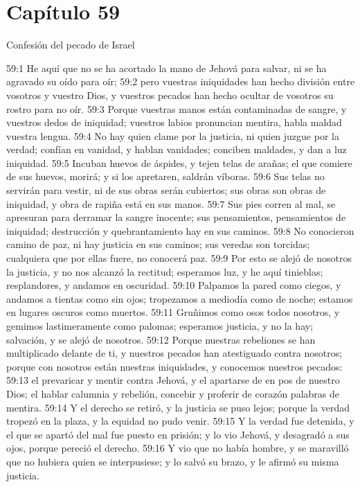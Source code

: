 \section*{Capítulo 59 }
Confesión del pecado de Israel 
 
59:1 He aquí que no se ha acortado la mano de Jehová para salvar, ni se ha agravado su oído para oír; 
59:2 pero vuestras iniquidades han hecho división entre vosotros y vuestro Dios, y vuestros pecados han hecho ocultar de vosotros su rostro para no oír. 
59:3 Porque vuestras manos están contaminadas de sangre, y vuestros dedos de iniquidad; vuestros labios pronuncian mentira, habla maldad vuestra lengua. 
59:4 No hay quien clame por la justicia, ni quien juzgue por la verdad; confían en vanidad, y hablan vanidades; conciben maldades, y dan a luz iniquidad. 
59:5 Incuban huevos de áspides, y tejen telas de arañas; el que comiere de sus huevos, morirá; y si los apretaren, saldrán víboras. 
59:6 Sus telas no servirán para vestir, ni de sus obras serán cubiertos; sus obras son obras de iniquidad, y obra de rapiña está en sus manos. 
59:7 Sus pies corren al mal, se apresuran para derramar la sangre inocente; sus pensamientos, pensamientos de iniquidad; destrucción y quebrantamiento hay en sus caminos. 
59:8 No conocieron camino de paz, ni hay justicia en sus caminos; sus veredas son torcidas; cualquiera que por ellas fuere, no conocerá paz. 
59:9 Por esto se alejó de nosotros la justicia, y no nos alcanzó la rectitud; esperamos luz, y he aquí tinieblas; resplandores, y andamos en oscuridad. 
59:10 Palpamos la pared como ciegos, y andamos a tientas como sin ojos; tropezamos a mediodía como de noche; estamos en lugares oscuros como muertos. 
59:11 Gruñimos como osos todos nosotros, y gemimos lastimeramente como palomas; esperamos justicia, y no la hay; salvación, y se alejó de nosotros. 
59:12 Porque nuestras rebeliones se han multiplicado delante de ti, y nuestros pecados han atestiguado contra nosotros; porque con nosotros están nuestras iniquidades, y conocemos nuestros pecados: 
59:13 el prevaricar y mentir contra Jehová, y el apartarse de en pos de nuestro Dios; el hablar calumnia y rebelión, concebir y proferir de corazón palabras de mentira. 
59:14 Y el derecho se retiró, y la justicia se puso lejos; porque la verdad tropezó en la plaza, y la equidad no pudo venir. 
59:15 Y la verdad fue detenida, y el que se apartó del mal fue puesto en prisión; y lo vio Jehová, y desagradó a sus ojos, porque pereció el derecho. 
59:16 Y vio que no había hombre, y se maravilló que no hubiera quien se interpusiese; y lo salvó su brazo, y le afirmó su misma justicia. 
